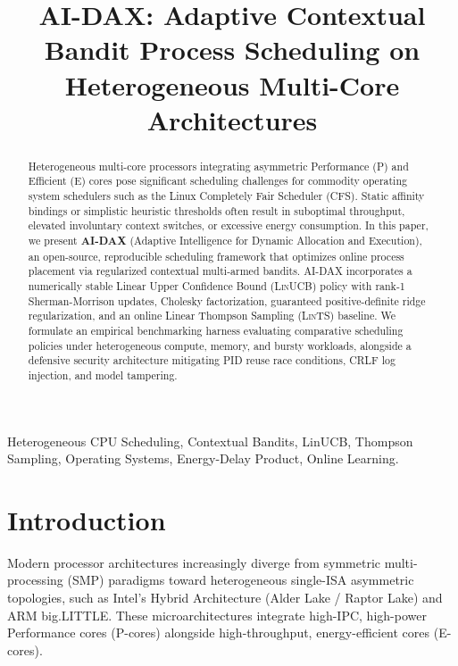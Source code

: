 \documentclass[conference]{IEEEtran}
\begin{document}
\title{AI-DAX: Adaptive Contextual Bandit Process Scheduling on Heterogeneous Multi-Core Architectures}

\author{
}

\maketitle

\begin{abstract}
Heterogeneous multi-core processors integrating asymmetric Performance (P) and Efficient (E) cores pose significant scheduling challenges for commodity operating system schedulers such as the Linux Completely Fair Scheduler (CFS). Static affinity bindings or simplistic heuristic thresholds often result in suboptimal throughput, elevated involuntary context switches, or excessive energy consumption. In this paper, we present \textbf{AI-DAX} (Adaptive Intelligence for Dynamic Allocation and Execution), an open-source, reproducible scheduling framework that optimizes online process placement via regularized contextual multi-armed bandits. AI-DAX incorporates a numerically stable Linear Upper Confidence Bound (\textsc{LinUCB}) policy with rank-1 Sherman-Morrison updates, Cholesky factorization, guaranteed positive-definite ridge regularization, and an online Linear Thompson Sampling (\textsc{LinTS}) baseline. We formulate an empirical benchmarking harness evaluating comparative scheduling policies under heterogeneous compute, memory, and bursty workloads, alongside a defensive security architecture mitigating PID reuse race conditions, CRLF log injection, and model tampering.
\end{abstract}

\begin{IEEEkeywords}
Heterogeneous CPU Scheduling, Contextual Bandits, LinUCB, Thompson Sampling, Operating Systems, Energy-Delay Product, Online Learning.
\end{IEEEkeywords}

\section{Introduction}
Modern processor architectures increasingly diverge from symmetric multi-processing (SMP) paradigms toward heterogeneous single-ISA asymmetric topologies, such as Intel's Hybrid Architecture (Alder Lake / Raptor Lake) and ARM big.LITTLE. These microarchitectures integrate high-IPC, high-power Performance cores (P-cores) alongside high-throughput, energy-efficient cores (E-cores).
\end{document}
